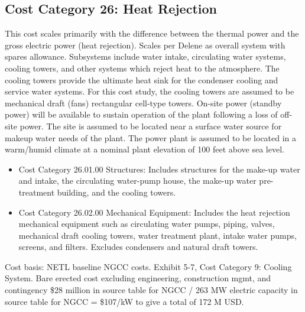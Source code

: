 \subsection{Cost Category 26: Heat Rejection} 

This cost scales primarily with the difference between the thermal power and the gross electric power (heat rejection). Scales per Delene as overall system with spares allowance.  Subsystems include water intake, circulating water systems, cooling towers, and other systems which reject heat to the atmosphere. The cooling towers provide the ultimate heat sink for the condenser cooling and service water systems.  For this cost study, the cooling towers are assumed to be mechanical draft (fans) rectangular cell-type towers.  On-site power (standby power) will be available to sustain operation of the plant following a loss of off-site power. The site is assumed to be located near a surface water source for makeup water needs of the plant.  The power plant is assumed to be located in a warm/humid climate at a nominal plant elevation of 100 feet above sea level.  

\begin{itemize}
    \item Cost Category 26.01.00 Structures: Includes structures for the make-up water and intake, the circulating water-pump house, the make-up water pre-treatment building, and the cooling towers.
    \item Cost Category 26.02.00 Mechanical Equipment: Includes the heat rejection mechanical equipment such as circulating water pumps, piping, valves, mechanical draft cooling towers, water treatment plant, intake water pumps, screens, and filters. Excludes condensers and natural draft towers.
\end{itemize}

Cost basis: NETL baseline NGCC costs. Exhibit 5-7, Cost Category 9: Cooling System. Bare erected cost excluding engineering, construction mgmt, and contingency \$28 million in source table for NGCC / 263 MW electric capacity in source table for NGCC = \$107/kW to give a total of 172 M USD.








